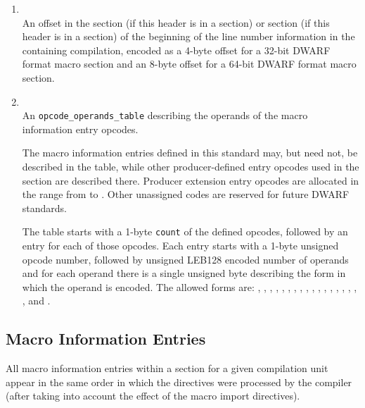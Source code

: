 \begin{enumerate}[1. ]
\item {} \\
An offset in the \dotdebugline{} section 
\bb
(if this header is in a \dotdebugmacro{} section) or \dotdebuglinedwo{} 
section (if this header is in a \dotdebugmacrodwo{} section)
\eb
of the beginning of the line number information in the containing
compilation, encoded as a 4-byte offset for a 32-bit DWARF 
format macro section and an 8-byte offset for a 64-bit DWARF format
macro section.  

\item {} \\
An \texttt{opcode\_operands\_table} describing the operands 
of the macro information entry opcodes.

The macro information entries defined in this standard may, but need not, be
described in the table, while other 
\bb
producer-defined 
\eb
entry opcodes used in the section are described there. 
\bb
Producer 
\eb
extension entry opcodes are
allocated in the range from \DWMACROlouser{} to \DWMACROhiuser. Other
unassigned codes are reserved for future DWARF standards.

The table starts with a 1-byte \texttt{count} of the defined opcodes, followed by
an entry for each of those opcodes.  Each entry starts with a 1-byte unsigned
opcode number, followed by unsigned LEB128 encoded number of operands
and for each operand there is a single unsigned byte describing the form in which
the operand is encoded.  The allowed forms are: 
\DWFORMblock, \DWFORMblockone, \DWFORMblocktwo, \DWFORMblockfour,
\DWFORMdataone, \DWFORMdatatwo, \DWFORMdatafour, \DWFORMdataeight, 
\DWFORMdatasixteen,  
\DWFORMflag, \DWFORMlinestrp, \DWFORMsdata, 
\DWFORMsecoffset, \DWFORMstring, \DWFORMstrp{},
\bb
\DWFORMstrpeight,
\eb 
\DWFORMstrpsup,
\bb
\DWFORMstrpsupeight,
\eb
\DWFORMstrxXN{} and \DWFORMudata.
\end{enumerate}

\subsection{Macro Information Entries}
\label{chap:macroinformationentries}
All macro information entries within a \dotdebugmacro{}
section for a given compilation unit appear in the same 
order in which the directives were processed by the 
compiler (after taking into account the effect of the
macro import directives).

